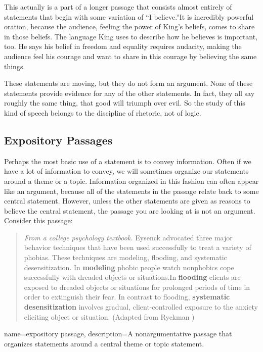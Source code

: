 This actually is a part of a longer passage that consists almost entirely of statements that begin with some variation of ``I believe.''It is incredibly powerful oration, because the audience, feeling the power of King's beliefs, comes to share in those beliefs. The language King uses to describe how he believes is important, too. He says his belief in freedom and equality requires audacity, making the audience feel his courage and want to share in this courage by believing the same things.

These statements are moving, but they do not form an argument. None of these statements provide evidence for any of the other statements. In fact, they all say roughly the same thing, that good will triumph over evil. So the study of this kind of speech belongs to the discipline of rhetoric, not of logic.

\subsection{Expository Passages}

Perhaps the most basic use of a statement is to convey information. Often if we have a lot of information to convey, we will sometimes organize our statements around a theme or a topic. Information organized in this fashion can often appear like an argument, because all of the statements in the passage relate back to some central statement. However, unless the other statements are given as reasons to believe the central statement, the passage you are looking at is not an argument. Consider this passage:

\begin{quotation}\noindent\textit{From a college psychology textbook.} Eysenck advocated three major behavior techniques that have been used successfully to treat a variety of phobias. These techniques are modeling, flooding, and systematic desensitization. In \textbf{modeling} phobic people watch nonphobics cope successfully with dreaded objects or situations.In \textbf{flooding} clients are exposed to dreaded objects or situations for prolonged periods of time in order to extinguish their fear. In contrast to flooding, \textbf{systematic desensitization} involves gradual, client-controlled exposure to the anxiety eliciting object or situation. (Adapted from Ryckman \cite*{Ryckman2007}) \end{quotation}

{
name=expository passage,
description={A nonargumentative passage that organizes statements around a central theme or topic statement.}
}

